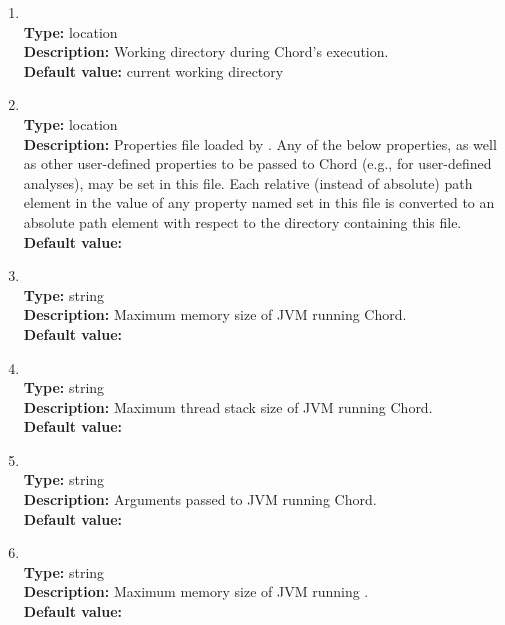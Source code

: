 \begin{enumerate}
\item
{} \\
{\bf Type:} location \\
{\bf Description:} Working directory during Chord's execution. \\
{\bf Default value:} current working directory

\item
{} \\
{\bf Type:} location \\
{\bf Description:} Properties file loaded by .  Any of the below properties, as well as other user-defined properties to be passed to Chord (e.g., for user-defined analyses), may be set in this file.  Each relative (instead of absolute) path element in the value of any property named  set in this file is converted to an absolute path element with respect to the directory containing this file. \\
{\bf Default value:}  

\item
{} \\
{\bf Type:} string \\
{\bf Description:} Maximum memory size of JVM running Chord. \\
{\bf Default value:}  

\item 
{} \\
{\bf Type:} string \\
{\bf Description:} Maximum thread stack size of JVM running Chord. \\
{\bf Default value:}  

\item
{} \\
{\bf Type:} string \\
{\bf Description:} Arguments passed to JVM running Chord. \\
{\bf Default value:} 

\item
{} \\
{\bf Type:} string \\
{\bf Description:} Maximum memory size of JVM running \bddbddb. \\
{\bf Default value:}  


\end{enumerate}
